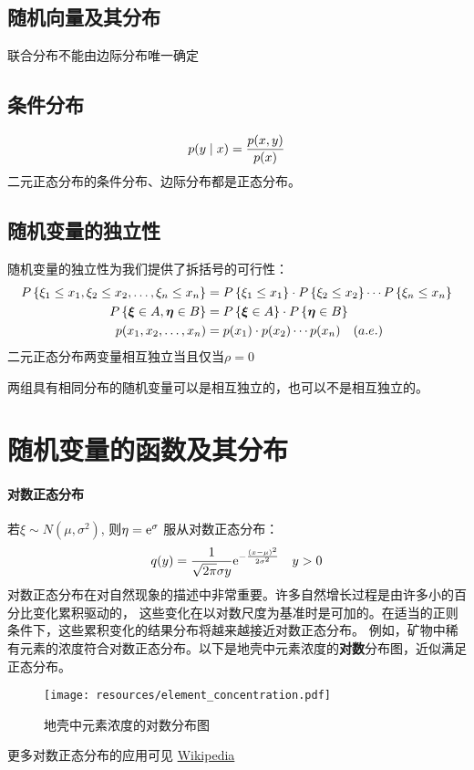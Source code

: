 \subsection{随机向量及其分布}
联合分布不能由边际分布唯一确定
\subsection{条件分布}
\[
    p(y\mid x)=\frac{p(x,y)}{p(x)} \\
\]
二元正态分布的条件分布、边际分布都是正态分布。
\subsection{随机变量的独立性}
随机变量的独立性为我们提供了拆括号的可行性：
\begin{align*}
    \P{\xi_{1} \leq x_{1}, \xi_{2} \leq x_{2}, \dots ,
    \xi_{n} \leq x_{n}} &=
    \P{\xi_{1} \leq x_{1}} \cdot
    \P{\xi_{2} \leq x_{2}} \cdots
    \P{\xi_{n} \leq x_{n}}\\
    \P{\boldsymbol{\xi} \in A, \boldsymbol{\eta} \in B} &=
    \P{\boldsymbol{\xi} \in A} \cdot
    \P{\boldsymbol{\eta} \in B} \\
    p(x_{1},x_{2},\ldots,x_{n}) &= p(x_{1}) \cdot p(x_{2})
    \cdots p(x_{n}) \quad (a. e.)
\end{align*}
二元正态分布两变量相互独立当且仅当\(\rho=0\)

两组具有相同分布的随机变量可以是相互独立的，也可以不是相互独立的。

\section{随机变量的函数及其分布}

\paragraph{对数正态分布}
若\(\xi\sim N(\mu,\sigma^{2})\), 则\(\eta=\e^{\sigma} \) 服从对数正态分布：
\[
    q(y) = \frac{1}{\sqrt{2\pi}\sigma y}
    \e^{-\frac{(x-\mu)^{2}}{2\sigma^{2}}}\quad y>0
\]
对数正态分布在对自然现象的描述中非常重要。许多自然增长过程是由许多小的百分比变化累积驱动的，
这些变化在以对数尺度为基准时是可加的。在适当的正则条件下，这些累积变化的结果分布将越来越接近对数正态分布。
例如，矿物中稀有元素的浓度符合对数正态分布。以下是地壳中元素浓度的\textbf{对数}分布图，近似满足正态分布。
\begin{figure}[H]
    \centering
    \texttt{[image: resources/element\_concentration.pdf]}
    \caption{地壳中元素浓度的对数分布图}
    \label{fig:lognormal}
\end{figure}

更多对数正态分布的应用可见
\href{https://en.wikipedia.org/wiki/Log-normal_distribution#Occurrence_and_applications}{Wikipedia}
